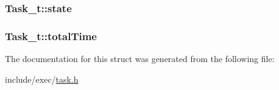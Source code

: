\hypertarget{structTask__t_af387ad54a097d50b2883d3d9352abeac}{
\subsubsection[{state}]{ Task\+\_\+t\+::state}}\label{structTask__t_af387ad54a097d50b2883d3d9352abeac}
\hypertarget{structTask__t_ad613b9d3b5f8f30b8cd4efe1763011f8}{
\subsubsection[{total\+Time}]{ Task\+\_\+t\+::total\+Time}}\label{structTask__t_ad613b9d3b5f8f30b8cd4efe1763011f8}


The documentation for this struct was generated from the following file\+:\begin{DoxyCompactItemize}
\item 
include/exec/\hyperlink{task_8h}{task.\+h}\end{DoxyCompactItemize}
